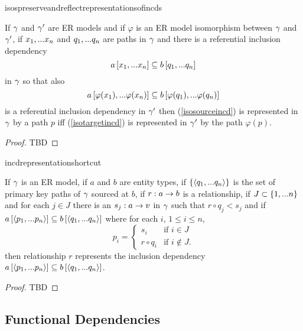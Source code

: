 isospreserveandreflectrepresentationsofincds
\begin{lemma}
\label{isospreserveandreflectrepresentationsofincds}
If $\gamma$ and $\gamma'$ are ER models and  if  $\varphi$ is an ER model isomorphism between $\gamma$  and $\gamma'$,  
if $x_1,...x_n$ and $q_1,...q_n$ are paths in 
$\gamma$
and there is a referential  inclusion dependency
\begin{equation}
\label{isosourceincd}
a\left[x_1,...x_n\right]\subseteq b\left[q_1,...q_n\right]
\end{equation}
 in $\gamma$ 
so that also 
\begin{equation}
\label{isotargetincd}
a\left[\varphi(x_1),...\varphi(x_n)\right]\subseteq b\left[\varphi(q_1),...\varphi(q_n)\right]
\end{equation}
is a referential inclusion dependency in $\gamma'$
then (\ref{isosourceincd}) is represented in $\gamma$ by a path $p$
iff (\ref{isotargetincd}) is represented in $\gamma'$ by the path $\varphi(p)$.
\end{lemma}
\begin{proof}
TBD
\end{proof}

incdrepresentationshortcut
\begin{lemma}
\label{incdrepresentationshortcut}
If $\gamma$ is an ER model, if $a$ and $b$ are entity types, if $\left\{\langle q_1,...q_n\rangle\right\}$ is the set
of primary key paths of $\gamma$ sourced at $b$, if $r:a \rightarrow b$ is a relationship, 
if $J \subset \left\{1,...n\right\}$ and for each $j \in J$ there is an $s_j:a \rightarrow v$ in $\gamma$ such that $r \circ q_j < s_j$  and if $a\left[\langle p_1,...p_n\rangle\right]\subseteq b\left[\langle q_1,...q_n\rangle\right]$
where for each $i$, $1 \leq i \leq n$, 
$$
p_i =
\begin{cases} 
    s_i         & \mbox{if $i \in J$} \\
    r \circ q_i & \mbox{if $i \notin J$.}
\end{cases} 
$$
then relationship $r$ represents the inclusion dependency  $a\left[\langle p_1,...p_n\rangle\right]\subseteq b\left[\langle q_1,...q_n\rangle\right]$.
\end{lemma}
\begin{proof}
TBD
\end{proof}


\subsection{Functional Dependencies}

